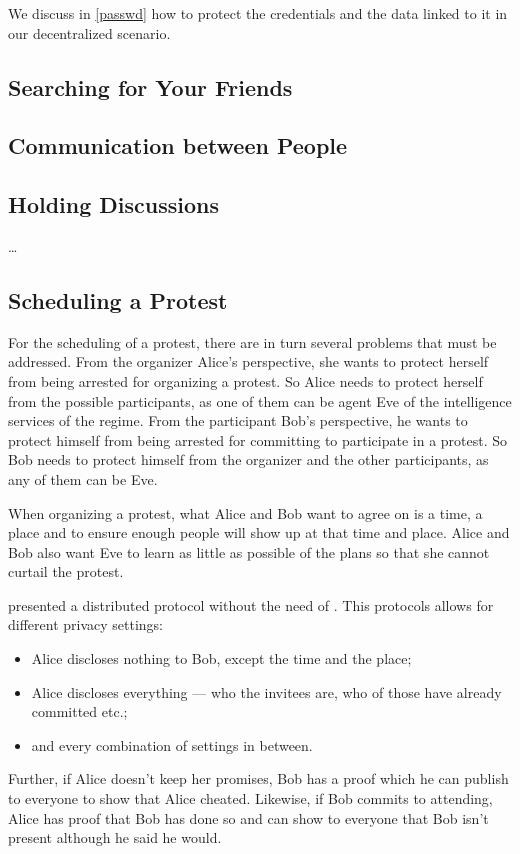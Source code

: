 We discuss in \cref{passwd} how to protect the credentials and the data linked to 
it in our decentralized scenario.

\subsection{Searching for Your Friends}
\label{UserSearch}





\subsection{Communication between People}
\label{Communicating}



\subsection{Holding Discussions}
\label{Discussions}

\citet{multiotr2009} \dots



\subsection{Scheduling a Protest}
\label{Scheduling}

For the scheduling of a protest, there are in turn several problems that must 
be addressed.
From the organizer Alice's perspective, she wants to protect herself from being 
arrested for organizing a protest.
So Alice needs to protect herself from the possible participants, as one of 
them can be agent Eve of the intelligence services of the regime.
From the participant Bob's perspective, he wants to protect himself from being 
arrested for committing to participate in a protest.
So Bob needs to protect himself from the organizer and the other participants, 
as any of them can be Eve.

When organizing a protest, what Alice and Bob want to agree on is a time, 
a place and to ensure enough people will show up at that time and place.
Alice and Bob also want Eve to learn as little as possible of the plans so 
that she cannot curtail the protest.

\citet{EventsInvitations} presented a distributed protocol without the need of 
.
This protocols allows for different privacy settings:
\begin{itemize}
\item Alice discloses nothing to Bob, except the time and the place;
\item Alice discloses everything --- who the invitees are, who of those have 
  already committed etc.;
\item and every combination of settings in between.
\end{itemize}
Further, if Alice doesn't keep her promises, Bob has a proof which he can 
publish to everyone to show that Alice cheated.
Likewise, if Bob commits to attending, Alice has proof that Bob has done so and 
can show to everyone that Bob isn't present although he said he would.

